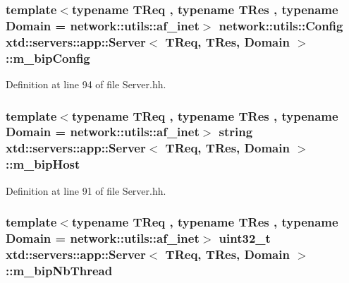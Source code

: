 \subsubsection[{\texorpdfstring{m\+\_\+bip\+Config}{m_bipConfig}}]{\setlength{\rightskip}{0pt plus 5cm}template$<$typename T\+Req , typename T\+Res , typename Domain  = network\+::utils\+::af\+\_\+inet$>$ network\+::utils\+::\+Config {\bf xtd\+::servers\+::app\+::\+Server}$<$ T\+Req, T\+Res, Domain $>$\+::m\+\_\+bip\+Config\hspace{0.3cm}{\ttfamily [protected]}}\hypertarget{classxtd_1_1servers_1_1app_1_1Server_a62a3f48e47eba551b53d0bef859aa906}{}\label{classxtd_1_1servers_1_1app_1_1Server_a62a3f48e47eba551b53d0bef859aa906}


Definition at line 94 of file Server.\+hh.

\subsubsection[{\texorpdfstring{m\+\_\+bip\+Host}{m_bipHost}}]{\setlength{\rightskip}{0pt plus 5cm}template$<$typename T\+Req , typename T\+Res , typename Domain  = network\+::utils\+::af\+\_\+inet$>$ string {\bf xtd\+::servers\+::app\+::\+Server}$<$ T\+Req, T\+Res, Domain $>$\+::m\+\_\+bip\+Host\hspace{0.3cm}{\ttfamily [protected]}}\hypertarget{classxtd_1_1servers_1_1app_1_1Server_a08752041a6fc98289ad93c93c1d4fd75}{}\label{classxtd_1_1servers_1_1app_1_1Server_a08752041a6fc98289ad93c93c1d4fd75}


Definition at line 91 of file Server.\+hh.

\subsubsection[{\texorpdfstring{m\+\_\+bip\+Nb\+Thread}{m_bipNbThread}}]{\setlength{\rightskip}{0pt plus 5cm}template$<$typename T\+Req , typename T\+Res , typename Domain  = network\+::utils\+::af\+\_\+inet$>$ uint32\+\_\+t {\bf xtd\+::servers\+::app\+::\+Server}$<$ T\+Req, T\+Res, Domain $>$\+::m\+\_\+bip\+Nb\+Thread\hspace{0.3cm}{\ttfamily [protected]}}\hypertarget{classxtd_1_1servers_1_1app_1_1Server_a4e7cb3d792a27b1572aa775f8f0018f3}{}\label{classxtd_1_1servers_1_1app_1_1Server_a4e7cb3d792a27b1572aa775f8f0018f3}


